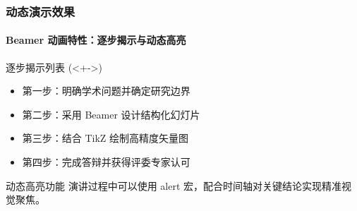 \begin{frame}
\frametitle{动态演示效果}
\framesubtitle{Beamer 动画特性：逐步揭示与动态高亮}

\begin{block}{逐步揭示列表 (<+->)}
\begin{itemize}[<+->]
  \item 第一步：明确学术问题并确定研究边界
  \item 第二步：采用 Beamer 设计结构化幻灯片
  \item 第三步：结合 TikZ 绘制高精度矢量图
  \item 第四步：完成答辩并获得评委专家认可
\end{itemize}
\end{block}

\pause

\begin{exampleblock}{动态高亮功能}
演讲过程中可以使用 \alert<+>{alert} 宏，配合时间轴对关键结论实现\alert<2>{精准视觉聚焦}。
\end{exampleblock}
\end{frame}
